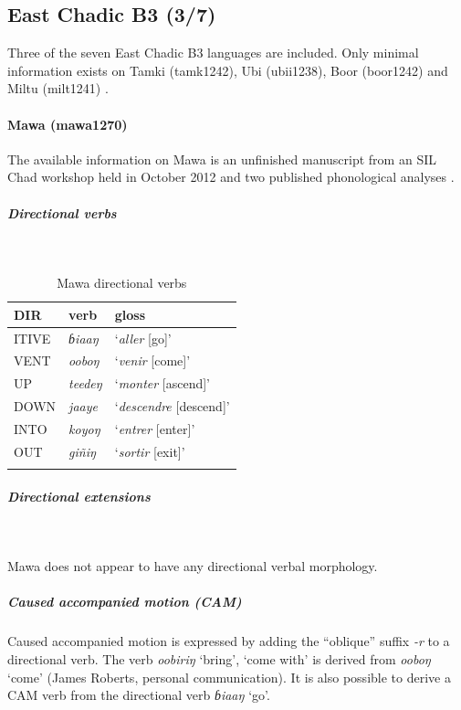 \subsection{East Chadic B3 (3/7)}

Three of the seven East Chadic B3 languages are included. Only minimal information exists on Tamki (tamk1242), Ubi (ubii1238), Boor (boor1242) \citep[documented for the first time by][]{robertsInitialFindingsBoor2021} and Miltu (milt1241) \citep[see the 1972 fieldnotes published as][]{jungraithmayrNotesGaliMiltu2019}.

\paragraph*{Mawa (mawa1270)} \label{mawa}

The available information on Mawa is an unfinished manu\-script from an SIL Chad workshop held in October 2012 \citep{hisseneEsquisseGrammaticaleLangue2010} and two published phonological analyses \citep{robertsPalatalizationLabializationMawa2009,robertsToneSystemMawa2012}.

\subparagraph{Directional verbs}~

\begin{table}[H]
	\caption{Mawa directional verbs} 
	\label{tab:mawaV}
	\begin{tabular}{lll} %
		\lsptoprule
		DIR & verb & gloss   \\ %
		\midrule
		ITIVE & \textit{ɓiaaŋ} & `\textit{aller} [go]' \\
		VENT & \textit{ooboŋ} & `\textit{venir} [come]' \\
		UP & \textit{teedeŋ} &  `\textit{monter} [ascend]' \\
		DOWN & \textit{jaaye} &  `\textit{descendre} [descend]' \\
		INTO& \textit{koyoŋ} &  `\textit{entrer} [enter]' \\
		OUT & \textit{giñiŋ} &  `\textit{sortir} [exit]' \\
		\lspbottomrule
	\end{tabular}
\end{table}

\subparagraph{Directional extensions}~

Mawa does not appear to have any directional verbal morphology.

\subparagraph{Caused accompanied motion (CAM)}

Caused accompanied motion is expres\-sed by adding the ``oblique'' suffix \textit{-r} to a directional verb. The verb \textit{oobiriŋ} `bring', `come with'  is derived from \textit{ooboŋ} `come' (James Roberts, personal communication). It is also possible to derive a CAM verb from the directional verb \textit{ɓiaaŋ} `go'.

